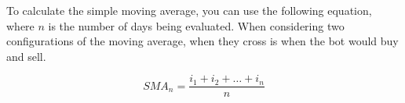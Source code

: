 To calculate the simple moving average, you can use the following equation, where $n$ is the number
of days being evaluated. When considering two configurations of the moving average, when they cross
is when the bot would buy and sell.

\begin{equation}
  SMA_n = \frac{i_1 + i_2 + \dots + i_n}{n}
\end{equation}


